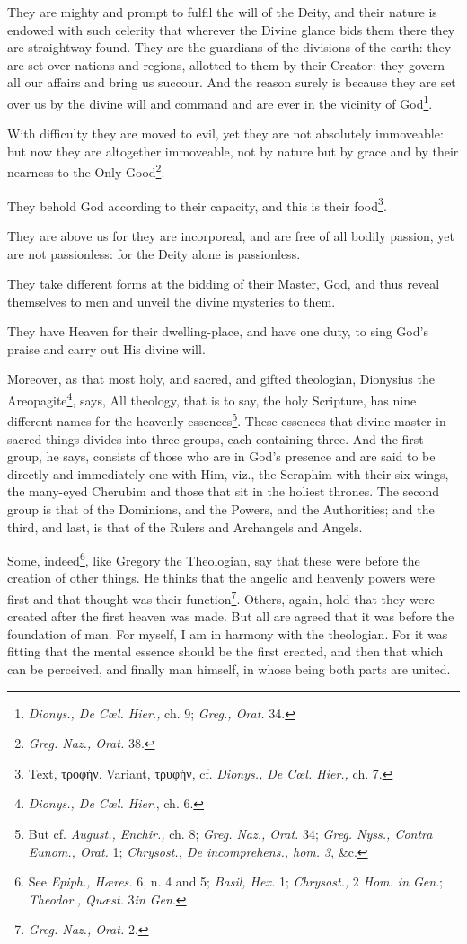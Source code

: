 They are mighty and prompt to fulfil the will of the Deity, and their nature is endowed with such celerity that wherever the Divine glance bids them there they are straightway found. They are the guardians of the divisions of the earth: they are set over nations and regions, allotted to them by their Creator: they govern all our affairs and bring us succour. And the reason surely is because they are set over us by the divine will and command and are ever in the vicinity of God\footnote{\emph{Dionys., De Cœl. Hier., }ch. 9; \emph{Greg., Orat. }34.}.

With difficulty they are moved to evil, yet they are not absolutely immoveable: but now they are altogether immoveable, not by nature but by grace and by their nearness to the Only Good\footnote{\emph{Greg. Naz., Orat. }38.}.

They behold God according to their capacity, and this is their food\footnote{Text, \textgreek{τροφήν}. Variant, \textgreek{τρυφήν}, cf. \emph{Dionys., De Cœl. Hier., }ch. 7.}.

They are above us for they are incorporeal, and are free of all bodily passion, yet are not passionless: for the Deity alone is passionless.

They take different forms at the bidding of their Master, God, and thus reveal themselves to men and unveil the divine mysteries to them.

They have Heaven for their dwelling-place, and have one duty, to sing God’s praise and carry out His divine will.

Moreover, as that most holy, and sacred, and gifted theologian, Dionysius the Areopagite\footnote{\emph{Dionys., De Cœl. Hier}., ch. 6.}, says, All theology, that is to say, the holy Scripture, has nine different names for the heavenly essences\footnote{But cf. \emph{August., Enchir., }ch. 8; \emph{Greg. Naz., Orat. }34; \emph{Greg. Nyss., Contra Eunom., Orat. }1; \emph{Chrysost., De incomprehens., hom. 3}, \&c.}. These essences that divine master in sacred things divides into three groups, each containing three. And the first group, he says, consists of those who are in God’s presence and are said to be directly and immediately one with Him, viz., the Seraphim with their six wings, the many-eyed Cherubim and those that sit in the holiest thrones. The second group is that of the Dominions, and the Powers, and the Authorities; and the third, and last, is that of the Rulers and Archangels and Angels.

Some, indeed\footnote{See \emph{Epiph., Hæres. }6, n. 4 and 5; \emph{Basil, Hex. }1; \emph{Chrysost., }2 \emph{Hom. in Gen}.; \emph{Theodor., Quæst.} 3\emph{in Gen}.}, like Gregory the Theologian, say that these were before the creation of other things. He thinks that the angelic and heavenly powers were first and that thought was their function\footnote{\emph{Greg. Naz., Orat. }2.}. Others, again, hold that they were created after the first heaven was made. But all are agreed that it was before the foundation of man. For myself, I am in harmony with the theologian. For it was fitting that the mental essence should be the first created, and then that which can be perceived, and finally man himself, in whose being both parts are united.

